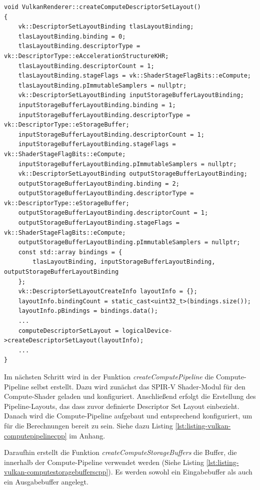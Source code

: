 \documentclass[11pt]{scrartcl}
\begin{document}
	\begin{lstlisting}[caption={Erzeugen des \textit{Descriptor Set Layouts} in VulkanRenderer.cpp},label={lst:listing-vulkan-descriptorsetlayoutcpp}]
void VulkanRenderer::createComputeDescriptorSetLayout()
{
	vk::DescriptorSetLayoutBinding tlasLayoutBinding;
	tlasLayoutBinding.binding = 0;
	tlasLayoutBinding.descriptorType = vk::DescriptorType::eAccelerationStructureKHR;
	tlasLayoutBinding.descriptorCount = 1;
	tlasLayoutBinding.stageFlags = vk::ShaderStageFlagBits::eCompute;
	tlasLayoutBinding.pImmutableSamplers = nullptr;
	vk::DescriptorSetLayoutBinding inputStorageBufferLayoutBinding;
	inputStorageBufferLayoutBinding.binding = 1;
	inputStorageBufferLayoutBinding.descriptorType = vk::DescriptorType::eStorageBuffer;
	inputStorageBufferLayoutBinding.descriptorCount = 1;
	inputStorageBufferLayoutBinding.stageFlags = vk::ShaderStageFlagBits::eCompute;
	inputStorageBufferLayoutBinding.pImmutableSamplers = nullptr;
	vk::DescriptorSetLayoutBinding outputStorageBufferLayoutBinding;
	outputStorageBufferLayoutBinding.binding = 2;
	outputStorageBufferLayoutBinding.descriptorType = vk::DescriptorType::eStorageBuffer;
	outputStorageBufferLayoutBinding.descriptorCount = 1;
	outputStorageBufferLayoutBinding.stageFlags = vk::ShaderStageFlagBits::eCompute;
	outputStorageBufferLayoutBinding.pImmutableSamplers = nullptr;
	const std::array bindings = {
		tlasLayoutBinding, inputStorageBufferLayoutBinding, outputStorageBufferLayoutBinding
	};
	vk::DescriptorSetLayoutCreateInfo layoutInfo = {};
	layoutInfo.bindingCount = static_cast<uint32_t>(bindings.size());
	layoutInfo.pBindings = bindings.data();
	...
	computeDescriptorSetLayout = logicalDevice->createDescriptorSetLayout(layoutInfo);
	...
}	\end{lstlisting}
	
	Im nächsten Schritt wird in der Funktion \textit{createComputePipeline} die Compute-Pipeline selbst erstellt. Dazu wird zunächst das SPIR-V Shader-Modul für den Compute-Shader geladen und konfiguriert. Anschließend erfolgt die Erstellung des Pipeline-Layouts, das dass zuvor definierte Descriptor Set Layout einbezieht. Danach wird die Compute-Pipeline aufgebaut und entsprechend konfiguriert, um für die Berechnungen bereit zu sein. Siehe dazu Listing \ref{lst:listing-vulkan-computepipelinecpp} im Anhang.
	
	Daraufhin erstellt die Funktion \textit{createComputeStorageBuffers} die Buffer, die innerhalb der Compute-Pipeline verwendet werden (Siehe Listing \ref{lst:listing-vulkan-computestoragebufferscpp}). Es werden sowohl ein Eingabebuffer als auch ein Ausgabebuffer angelegt. 
	
\end{document}
